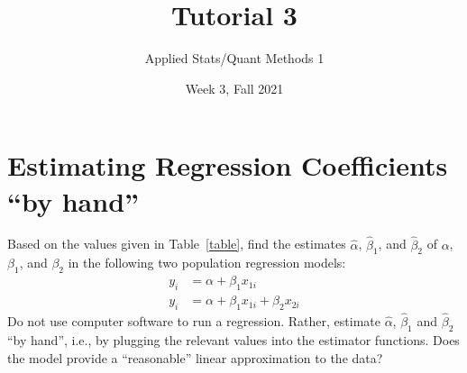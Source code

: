 \documentclass[12pt,letterpaper]{article}
\title{Tutorial 3}
\date{Week 3, Fall 2021}
\author{Applied Stats/Quant Methods 1}
\begin{document}
	\maketitle
	
%	
%

\section{Estimating Regression Coefficients ``by hand''}

Based on the values given in Table~\ref{table}, find the estimates $\hat{\alpha}$, $\hat{\beta}_{1}$, and $\hat{\beta}_{2}$ of $\alpha$, $\beta_{1}$, and $\beta_{2}$ in the following two population regression models:
\begin{align*}
y_{i} &= \alpha + \beta_{1} x_{1i} \\
y_{i} &= \alpha + \beta_{1} x_{1i} + \beta_{2} x_{2i} 
\end{align*}
Do not use computer software to run a regression.  Rather, estimate $\hat{\alpha}$, $\hat{\beta}_{1}$ and $\hat{\beta}_{2}$ ``by hand'', i.e., by plugging the relevant values into the estimator functions.  Does the model provide a ``reasonable'' linear approximation to the data?
\end{document}
